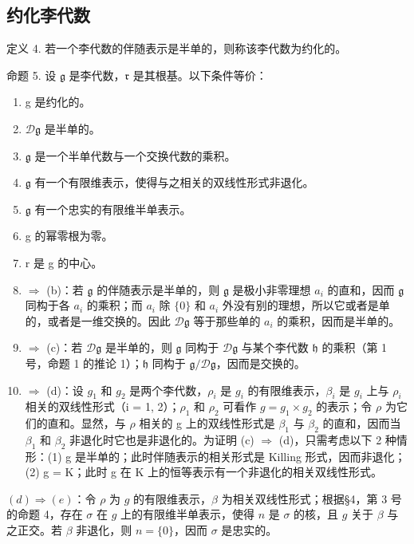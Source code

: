 \subsection{约化李代数}

定义 4. 若一个李代数的伴随表示是半单的，则称该李代数为约化的。

命题 5. 设 \(\mathfrak{g}\) 是李代数，\(\mathfrak{r}\) 是其根基。以下条件等价：

\begin{enumerate}
\def\labelenumi{(\alph{enumi})}
\item
  g 是约化的。
\item
  \(\mathcal{D}\mathfrak{g}\) 是半单的。
\item
  \(\mathfrak{g}\) 是一个半单代数与一个交换代数的乘积。
\item
  \(\mathfrak{g}\) 有一个有限维表示，使得与之相关的双线性形式非退化。
\item
  \(\mathfrak{g}\) 有一个忠实的有限维半单表示。
\item
  g 的幂零根为零。
\item
  r 是 g 的中心。
\item
  \(\Rightarrow\) (b)：若 \(\mathfrak{g}\) 的伴随表示是半单的，则 \(\mathfrak{g}\) 是极小非零理想 \(a_{i}\) 的直和，因而 \(\mathfrak{g}\) 同构于各 \(a_{i}\) 的乘积；而 \(a_{i}\) 除 \(\{0\}\) 和 \(a_{i}\) 外没有别的理想，所以它或者是单的，或者是一维交换的。因此 \(\mathcal{D}\mathfrak{g}\) 等于那些单的 \(a_{i}\) 的乘积，因而是半单的。
\item
  \(\Rightarrow\) (c)：若 \(\mathcal{D}\mathfrak{g}\) 是半单的，则 \(\mathfrak{g}\) 同构于 \(\mathcal{D}\mathfrak{g}\) 与某个李代数 \(\mathfrak{h}\) 的乘积（第 1 号，命题 1 的推论 1）；\(\mathfrak{h}\) 同构于 \(\mathfrak{g}/\mathcal{D}\mathfrak{g}\)，因而是交换的。
\item
  \(\Rightarrow\) (d)：设 \(g_{1}\) 和 \(g_{2}\) 是两个李代数，\(\rho_{i}\) 是 \(g_{i}\) 的有限维表示，\(\beta_{i}\) 是 \(g_{i}\) 上与 \(\rho_{i}\) 相关的双线性形式（i = 1, 2）；\(\rho_{1}\) 和 \(\rho_{2}\) 可看作 \(g = g_{1} \times g_{2}\) 的表示；令 \(\rho\) 为它们的直和。显然，与 \(\rho\) 相关的 g 上的双线性形式是 \(\beta_{1}\) 与 \(\beta_{2}\) 的直和，因而当 \(\beta_{1}\) 和 \(\beta_{2}\) 非退化时它也是非退化的。为证明 (c) \(\Rightarrow\) (d)，只需考虑以下 2 种情形：(1) g 是半单的；此时伴随表示的相关形式是 Killing 形式，因而非退化；(2) g = K；此时 g 在 K 上的恒等表示有一个非退化的相关双线性形式。
\end{enumerate}

\((d) \Rightarrow (e)\)：令 \(\rho\) 为 \(g\) 的有限维表示，\(\beta\) 为相关双线性形式；根据§4，第 3 号的命题 4，存在 \(\sigma\) 在 \(g\) 上的有限维半单表示，使得 \(n\) 是 \(\sigma\) 的核，且 \(g\) 关于 \(\beta\) 与之正交。若 \(\beta\) 非退化，则 \(n = \{0\}\)，因而 \(\sigma\) 是忠实的。


